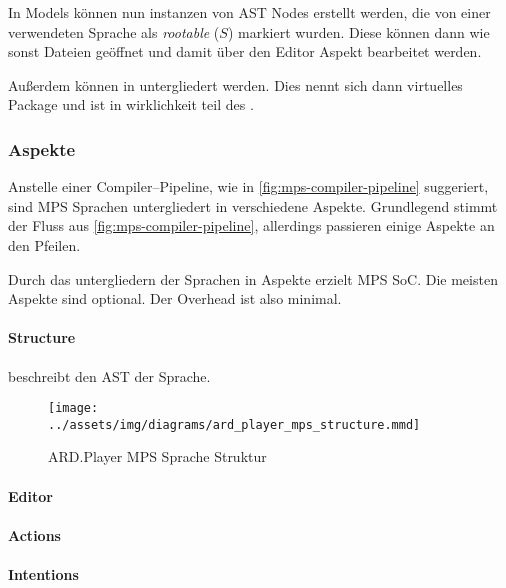 In Models können nun instanzen von \ac{AST} Nodes erstellt werden, die von einer verwendeten Sprache als \textit {rootable} ($S$) markiert wurden.
Diese können dann wie sonst Dateien geöffnet und damit über den Editor Aspekt bearbeitet werden.

Außerdem können  in  untergliedert werden.
Dies nennt sich dann virtuelles Package und ist in wirklichkeit teil des .

\subsubsection{Aspekte}\label{subsubsec:aspekte}
Anstelle einer Compiler--Pipeline, wie in \autoref{fig:mps-compiler-pipeline} suggeriert, sind \ac{MPS} Sprachen untergliedert in verschiedene Aspekte.
Grundlegend stimmt der Fluss aus \autoref{fig:mps-compiler-pipeline}, allerdings passieren einige Aspekte an den Pfeilen.

Durch das untergliedern der Sprachen in Aspekte erzielt \ac{MPS} \ac{SoC}.
Die meisten Aspekte sind optional.
Der Overhead ist also minimal.

\paragraph{Structure} beschreibt den \ac{AST} der Sprache.
\begin{figure}
    \texttt{[image: ../assets/img/diagrams/ard\_player\_mps\_structure.mmd]}
    \caption{ARD.Player MPS Sprache Struktur}
    \label{fig:ard-player-mps-structure}
\end{figure}


\lipsum[5]

\paragraph{Editor}
\lipsum[5]

\paragraph{Actions}
\lipsum[5]

\paragraph{Intentions}
\lipsum[5]

